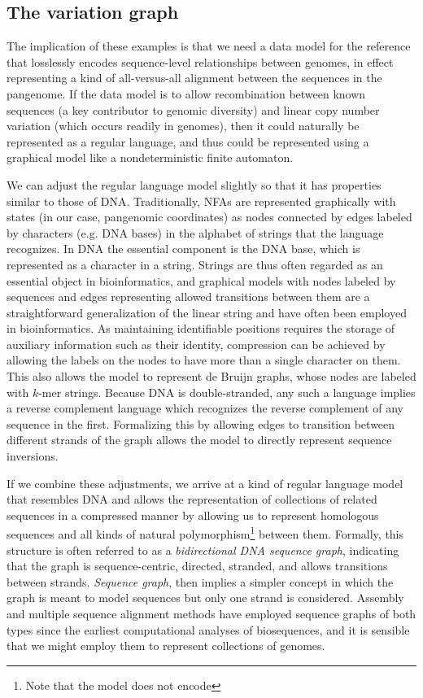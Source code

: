 \subsection{The variation graph}
\label{sec:the_variation_graph}

The implication of these examples is that we need a data model for the reference that losslessly encodes sequence-level relationships between genomes, in effect representing a kind of all-versus-all alignment between the sequences in the pangenome.
If the data model is to allow recombination between known sequences (a key contributor to genomic diversity) and linear copy number variation (which occurs readily in genomes), then it could naturally be represented as a regular language, and thus could be represented using a graphical model like a nondeterministic finite automaton.

We can adjust the regular language model slightly so that it has properties similar to those of DNA.
Traditionally, NFAs are represented graphically with states (in our case, pangenomic coordinates) as nodes connected by edges labeled by characters (e.g. DNA bases) in the alphabet of strings that the language recognizes.
In DNA the essential component is the DNA base, which is represented as a character in a string.
Strings are thus often regarded as an essential object in bioinformatics, and graphical models with nodes labeled by sequences and edges representing allowed transitions between them are a straightforward generalization of the linear string and have often been employed in bioinformatics.
As maintaining identifiable positions requires the storage of auxiliary information such as their identity, compression can be achieved by allowing the labels on the nodes to have more than a single character on them.
This also allows the model to represent de Bruijn graphs, whose nodes are labeled with $k$-mer strings.
Because DNA is double-stranded, any such a language implies a reverse complement language which recognizes the reverse complement of any sequence in the first.
Formalizing this by allowing edges to transition between different strands of the graph allows the model to directly represent sequence inversions.

If we combine these adjustments, we arrive at a kind of regular language model that resembles DNA and allows the representation of collections of related sequences in a compressed manner by allowing us to represent homologous sequences and all kinds of natural polymorphism\footnote{Note that the model does not encode } between them.
Formally, this structure is often referred to as a \emph{bidirectional DNA sequence graph}, indicating that the graph is sequence-centric, directed, stranded, and allows transitions between strands.
\emph{Sequence graph}, then implies a simpler concept in which the graph is meant to model sequences but only one strand is considered.
Assembly and multiple sequence alignment methods have employed sequence graphs of both types since the earliest computational analyses of biosequences, and it is sensible that we might employ them to represent collections of genomes.

